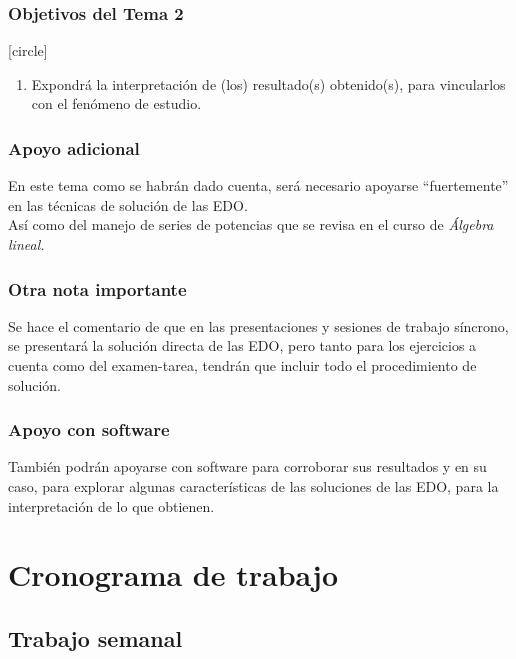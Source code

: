 \documentclass[12pt]{beamer}
\begin{document}
\begin{frame}
\frametitle{Objetivos del Tema 2}
[circle]
\begin{enumerate}
\conti
\item Expondrá la interpretación de (los) resultado(s) obtenido(s), para vincularlos con el fenómeno de estudio.
\seti
\end{enumerate}
\end{frame}
\begin{frame}
\frametitle{Apoyo adicional}
En este tema como se habrán dado cuenta, será necesario apoyarse \enquote{fuertemente} en las técnicas de solución de las EDO.
\\
\bigskip
\pause
Así como del manejo de series de potencias que se revisa en el curso de \emph{Álgebra lineal.}
\end{frame}
\begin{frame}
\frametitle{Otra nota importante}
Se hace el comentario de que en las presentaciones y sesiones de trabajo síncrono, se presentará la solución directa de las EDO, pero tanto para los ejercicios a cuenta como del examen-tarea, tendrán que incluir todo el procedimiento de solución.
\end{frame}
\begin{frame}
\frametitle{Apoyo con software}
También podrán apoyarse con software para corroborar sus resultados y en su caso, para explorar algunas características de las soluciones de las EDO, para la interpretación de lo que obtienen.
\end{frame}

\section{Cronograma de trabajo}
\subsection{Trabajo semanal}
\end{document}
